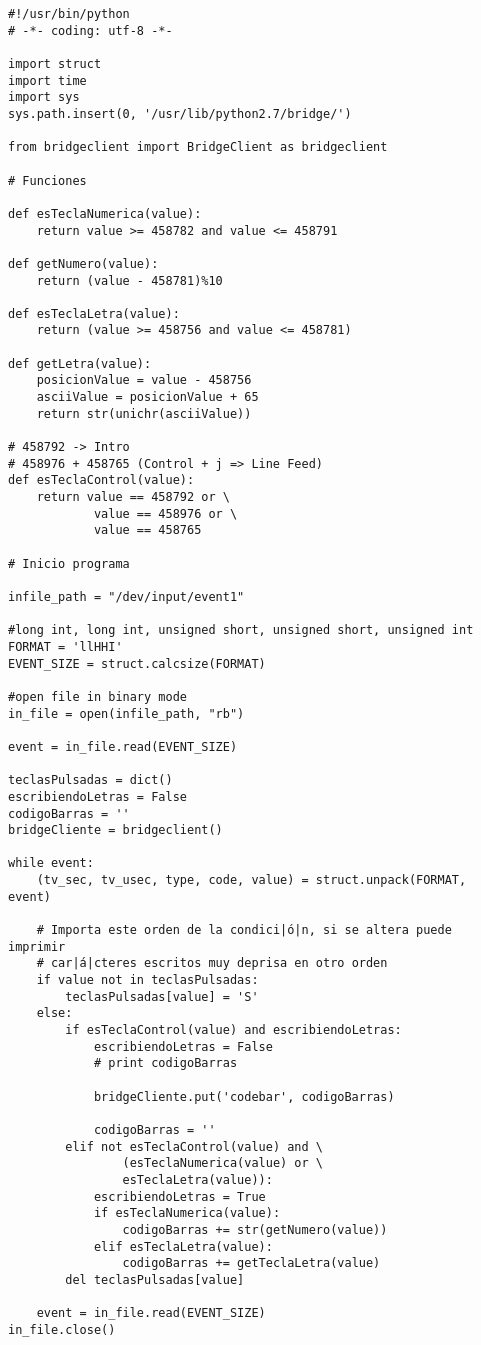\begin{lstlisting}
#!/usr/bin/python
# -*- coding: utf-8 -*-

import struct
import time
import sys
sys.path.insert(0, '/usr/lib/python2.7/bridge/')

from bridgeclient import BridgeClient as bridgeclient

# Funciones

def esTeclaNumerica(value):
    return value >= 458782 and value <= 458791

def getNumero(value):
    return (value - 458781)%10

def esTeclaLetra(value):
    return (value >= 458756 and value <= 458781)

def getLetra(value):
    posicionValue = value - 458756
    asciiValue = posicionValue + 65
    return str(unichr(asciiValue))

# 458792 -> Intro
# 458976 + 458765 (Control + j => Line Feed)
def esTeclaControl(value):
    return value == 458792 or \
            value == 458976 or \
            value == 458765

# Inicio programa

infile_path = "/dev/input/event1"

#long int, long int, unsigned short, unsigned short, unsigned int
FORMAT = 'llHHI'
EVENT_SIZE = struct.calcsize(FORMAT)

#open file in binary mode
in_file = open(infile_path, "rb")

event = in_file.read(EVENT_SIZE)

teclasPulsadas = dict()
escribiendoLetras = False
codigoBarras = ''
bridgeCliente = bridgeclient()

while event:
    (tv_sec, tv_usec, type, code, value) = struct.unpack(FORMAT, event)

    # Importa este orden de la condici|ó|n, si se altera puede imprimir
    # car|á|cteres escritos muy deprisa en otro orden
    if value not in teclasPulsadas:
        teclasPulsadas[value] = 'S'
    else:
        if esTeclaControl(value) and escribiendoLetras:
            escribiendoLetras = False
            # print codigoBarras

            bridgeCliente.put('codebar', codigoBarras)

            codigoBarras = ''
        elif not esTeclaControl(value) and \
                (esTeclaNumerica(value) or \
                esTeclaLetra(value)):
            escribiendoLetras = True
            if esTeclaNumerica(value):
                codigoBarras += str(getNumero(value))
            elif esTeclaLetra(value):
                codigoBarras += getTeclaLetra(value)
        del teclasPulsadas[value]

    event = in_file.read(EVENT_SIZE)
in_file.close()
\end{lstlisting}
